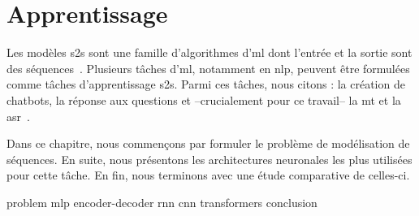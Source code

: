 \chapter{Apprentissage }
\label{chap.s2s}

Les modèles \gls{s2s} sont une famille d'algorithmes d'\gls{ml}
dont l'entrée et la sortie sont des séquences~\cite{Martins_2018}.
Plusieurs tâches d'\gls{ml}, notamment en \gls{nlp}, 
peuvent être formulées comme tâches d'apprentissage \gls{s2s}.
Parmi ces tâches, nous citons : la création de chatbots, la réponse aux questions
et --crucialement pour ce travail-- la \gls{mt} et la \gls{asr}~\cite{Fathi_2021}.

Dans ce chapitre, nous commençons par formuler le problème de modélisation de séquences.
En suite, nous présentons les architectures neuronales les plus utilisées pour cette tâche.
En fin, nous terminons avec une étude comparative de celles-ci.

{problem}
{mlp}
{encoder-decoder}
{rnn}
{cnn}
{transformers}
{conclusion}
